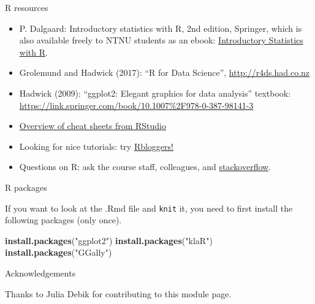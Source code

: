 \documentclass[ignorenonframetext,]{beamer}
\newenvironment{Shaded}{\begin{snugshade}}{\end{snugshade}}
\newcommand{\KeywordTok}[1]{\textcolor[rgb]{0.13,0.29,0.53}{\textbf{#1}}}
\newcommand{\StringTok}[1]{\textcolor[rgb]{0.31,0.60,0.02}{#1}}
\newcommand{\NormalTok}[1]{#1}
\begin{document}
\begin{frame}

\begin{block}{R resources}

\begin{itemize}
\item
  P. Dalgaard: Introductory statistics with R, 2nd edition, Springer,
  which is also available freely to NTNU students as an ebook:
  \href{http://link.springer.com/book/10.1007\%2F978-0-387-79054-1}{Introductory
  Statistics with R}.
\item
  Grolemund and Hadwick (2017): ``R for Data Science'',
  \url{http://r4ds.had.co.nz}
\item
  Hadwick (2009): ``ggplot2: Elegant graphics for data analysis''
  textbook:
  \url{https://link.springer.com/book/10.1007\%2F978-0-387-98141-3}
\item
  \href{https://www.rstudio.com/resources/cheatsheets/}{Overview of
  cheat sheets from RStudio}
\item
  Looking for nice tutorials: try
  \href{https://www.r-bloggers.com/}{Rbloggers!}
\item
  Questions on R: ask the course staff, colleagues, and
  \href{https://stackoverflow.com/}{stackoverflow}.
\end{itemize}

\end{block}

\end{frame}

\begin{frame}[fragile]{R packages}

If you want to look at the .Rmd file and \texttt{knit} it, you need to
first install the following packages (only once).

\begin{Shaded}
\begin{Highlighting}[]
\KeywordTok{install.packages}\NormalTok{(}\StringTok{"ggplot2"}\NormalTok{)}
\KeywordTok{install.packages}\NormalTok{(}\StringTok{"klaR"}\NormalTok{)}
\KeywordTok{install.packages}\NormalTok{(}\StringTok{"GGally"}\NormalTok{)}
\end{Highlighting}
\end{Shaded}

\end{frame}

\begin{frame}{Acknowledgements}

Thanks to Julia Debik for contributing to this module page.

\end{frame}
\end{document}
